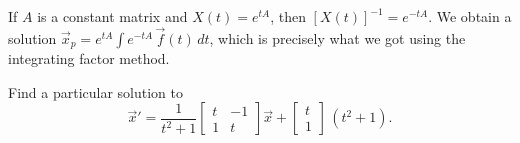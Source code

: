 If $A$ is a constant matrix and $X(t) = e^{tA}$, then
$\left[X(t)\right]^{-1} = e^{-tA}$.  
We obtain a solution
$\vec{x}_p = 
e^{tA}
\int e^{-tA}\,\vec{f}(t) \, dt$,
which is precisely what we got using the integrating factor method.

\begin{example}
Find a particular solution to
\begin{equation} \label{nhsys:vcexeq}
{\vec{x}}'
=
\frac{1}{t^2+1}
\begin{bmatrix}
t & -1 \\
1 & t
\end{bmatrix}
\vec{x}
+ \begin{bmatrix} t \\ 1 \end{bmatrix} \,(t^2+1) .
\end{equation}


\end{example}
